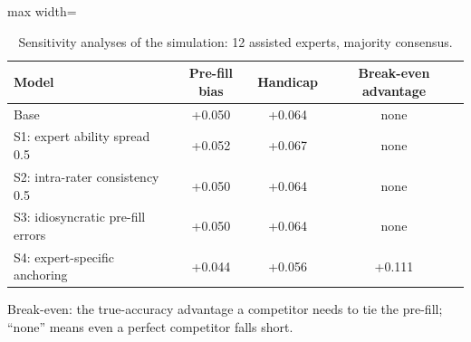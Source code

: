 \begin{table}[h!]
\centering
\footnotesize
\caption{Sensitivity analyses of the simulation: 12 assisted experts, majority consensus.}
\label{tab:s-sensitivity}
\begin{adjustbox}{max width=\linewidth}
\begin{tabular}{lccc}
\toprule
Model & Pre-fill bias & Handicap & Break-even advantage \\
\midrule
Base & +0.050 & +0.064 & none \\
S1: expert ability spread 0.5 & +0.052 & +0.067 & none \\
S2: intra-rater consistency 0.5 & +0.050 & +0.064 & none \\
S3: idiosyncratic pre-fill errors & +0.050 & +0.064 & none \\
S4: expert-specific anchoring & +0.044 & +0.056 & +0.111 \\
\bottomrule
\end{tabular}
\end{adjustbox}
\par\smallskip
\begin{minipage}{0.95\linewidth}\footnotesize Break-even: the true-accuracy advantage a competitor needs to tie the pre-fill; ``none'' means even a perfect competitor falls short.\end{minipage}
\end{table}

